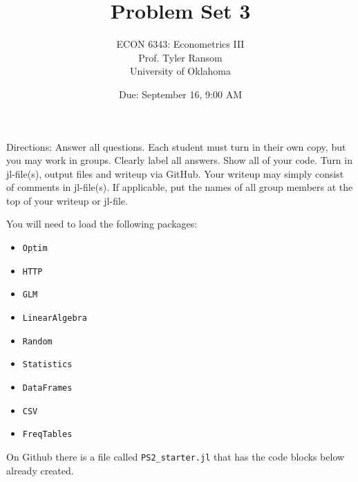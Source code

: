 \documentclass[12pt,english]{article}
\begin{document}
\title{Problem Set 3}
\author{ECON 6343: Econometrics III\\
Prof. Tyler Ransom\\
University of Oklahoma}
\date{Due: September 16, 9:00 AM}

\maketitle
Directions: Answer all questions. Each student must turn in their own copy, but you may work in groups. Clearly label all answers. Show all of your code. Turn in jl-file(s), output files and writeup via GitHub. Your writeup may simply consist of comments in jl-file(s). If applicable, put the names of all group members at the top of your writeup or jl-file.

You will need to load the following packages:
\begin{itemize}
    \item[~] \texttt{Optim} 
    \item[~] \texttt{HTTP} 
    \item[~] \texttt{GLM} 
    \item[~] \texttt{LinearAlgebra} 
    \item[~] \texttt{Random} 
    \item[~] \texttt{Statistics} 
    \item[~] \texttt{DataFrames} 
    \item[~] \texttt{CSV} 
    \item[~] \texttt{FreqTables}
\end{itemize}

On Github there is a file called \texttt{PS2\_starter.jl} that has the code blocks below already created.
\end{document}

